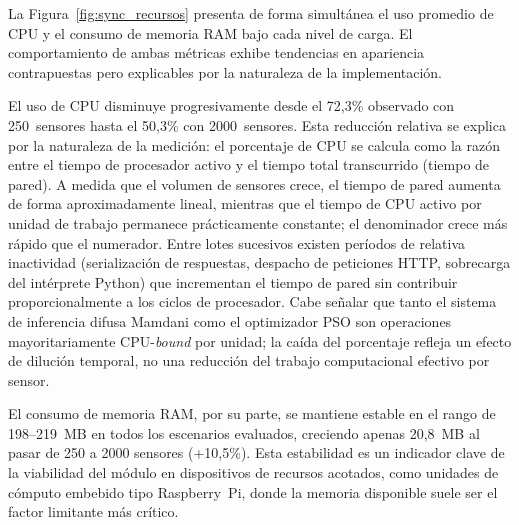 La Figura~\ref{fig:sync_recursos} presenta de forma simultánea el uso promedio de CPU y el
consumo de memoria RAM bajo cada nivel de carga. El comportamiento de ambas métricas
exhibe tendencias en apariencia contrapuestas pero explicables por la naturaleza de la
implementación.

El uso de CPU disminuye progresivamente desde el 72,3\% observado con 250~sensores
hasta el 50,3\% con 2000~sensores. Esta reducción relativa se explica por la naturaleza
de la medición: el porcentaje de CPU se calcula como la razón entre el tiempo de procesador
activo y el tiempo total transcurrido (tiempo de pared). A medida que el volumen de sensores
crece, el tiempo de pared aumenta de forma aproximadamente lineal, mientras que el tiempo
de CPU activo por unidad de trabajo permanece prácticamente constante; el denominador crece
más rápido que el numerador. Entre lotes sucesivos existen períodos de relativa inactividad
(serialización de respuestas, despacho de peticiones HTTP, sobrecarga del intérprete Python)
que incrementan el tiempo de pared sin contribuir proporcionalmente a los ciclos de
procesador. Cabe señalar que tanto el sistema de inferencia difusa Mamdani como el
optimizador PSO son operaciones mayoritariamente CPU-\textit{bound} por unidad; la caída
del porcentaje refleja un efecto de dilución temporal, no una reducción del trabajo
computacional efectivo por sensor.

El consumo de memoria RAM, por su parte, se mantiene estable en el rango de
198--219~MB en todos los escenarios evaluados, creciendo apenas 20,8~MB al pasar de
250 a 2000 sensores (+10,5\%). Esta estabilidad es un indicador clave de la viabilidad del
módulo en dispositivos de recursos acotados, como unidades de cómputo embebido tipo
Raspberry~Pi, donde la memoria disponible suele ser el factor limitante más crítico.

